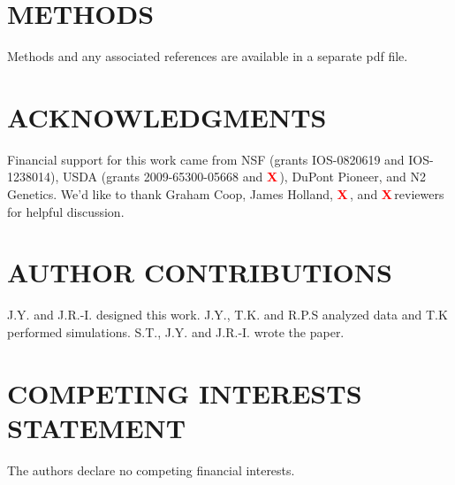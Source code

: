 \documentclass[twoside,twocolumn, letterpaper]{article}
\renewcommand{\baselinestretch}{1}
\newcommand{\X}{\textcolor{red}{\bf X\,}}
\begin{document}
\section*{METHODS}
Methods and any associated references are available in a separate pdf file.

\section*{ACKNOWLEDGMENTS}
Financial support for this work came from NSF (grants IOS-0820619 and IOS-1238014), USDA (grants 2009-65300-05668 and \X), DuPont Pioneer, and N2 Genetics. We'd like to thank Graham Coop, James Holland, \X, and \X reviewers for helpful discussion.

\section*{AUTHOR CONTRIBUTIONS}
J.Y. and J.R.-I. designed this work. J.Y., T.K. and R.P.S analyzed data and T.K performed simulations. S.T., J.Y. and J.R.-I. wrote the paper.

\section*{COMPETING INTERESTS STATEMENT}
The authors declare no competing financial interests.

{\scriptsize \sf
\renewcommand{\baselinestretch}{2.0}


}
\end{document}
